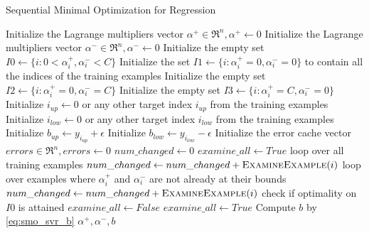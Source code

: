 \begin{breakablealgorithm}
	\caption{Sequential Minimal Optimization for Regression}
	\label{alg:smo_regression}
	\begin{algorithmic}
			\State Initialize the Lagrange multipliers vector $\alpha^+ \in \Re^n, \alpha^+ \gets 0$
			\State Initialize the Lagrange multipliers vector $\alpha^- \in \Re^n, \alpha^- \gets 0$
			\State Initialize the empty set $I0 \gets \{i : 0 < \alpha^+_i, \alpha^-_i < C\}$
			\State Initialize the set $I1 \gets \{i : \alpha^+_i = 0, \alpha^-_i = 0\}$ to contain all the indices of the training examples
			\State Initialize the empty set $I2 \gets \{i : \alpha^+_i = 0, \alpha^-_i = C\}$
			\State Initialize the empty set $I3 \gets \{i : \alpha^+_i = C, \alpha^-_i = 0\}$
			\State Initialize $i_{up} \gets 0$ \Comment or any other target index $i_{up}$ from the training examples
			\State Initialize $i_{low} \gets 0$ \Comment or any other target index $i_{low}$ from the training examples
			\State Initialize $b_{up} \gets y_{i_{up}} + \epsilon$
			\State Initialize $b_{low} \gets y_{i_{low}} - \epsilon$
			\State Initialize the error cache vector $errors \in \Re^n, errors \gets 0$
				\State $num\_changed \gets 0$
				\State $examine\_all \gets True$
					 \Comment loop over all training examples
						\State $num\_changed \gets num\_changed + \Call{ExamineExample}{i}$
					\EndFor
				\Else
					 \Comment loop over examples where $\alpha^+_i$ and $\alpha^-_i$ are not already at their bounds
						\State $num\_changed \gets num\_changed + \Call{ExamineExample}{i}$
						 \Comment check if optimality on $I0$ is attained
							\Break
						\EndIf
					\EndFor
				\EndIf
					\State $examine\_all \gets False$
					\State $examine\_all \gets True$
				\EndIf
			\EndWhile
			\State Compute $b$ by \eqref{eq:smo_svr_b}
			\State \Return $\alpha^+,\alpha^-,b$
		\EndFunction
	\end{algorithmic}
	

\end{breakablealgorithm}
